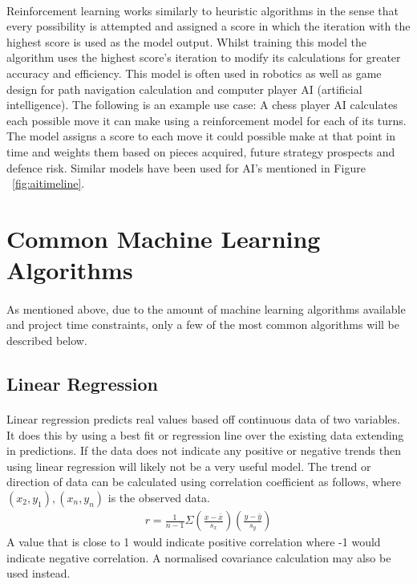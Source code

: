 \paragraph{}Reinforcement learning works similarly to heuristic algorithms in the sense that every possibility is attempted and assigned a score in which the iteration with the highest score is used as the model output. Whilst training this model the algorithm uses the highest score’s iteration to modify its calculations for greater accuracy and efficiency. This model is often used in robotics as well as game design for path navigation calculation and computer player AI (artificial intelligence). The following is an example use case: A chess player AI calculates each possible move it can make using a reinforcement model for each of its turns. The model assigns a score to each move it could possible make at that point in time and weights them based on pieces acquired, future strategy prospects and defence risk.
Similar models have been used for AI’s mentioned in Figure ~\ref{fig:aitimeline}.


\section{Common Machine Learning Algorithms}
\label{sec:section6}

\paragraph{}As mentioned above, due to the amount of machine learning algorithms available and project time constraints, only a few of the most common algorithms will be described below.
\subsection{Linear Regression} 
\paragraph{}Linear regression predicts real values based off continuous data of two variables. It does this by using a best fit or regression line over the existing data extending in predictions. If the data does not indicate any positive or negative trends then using linear regression will likely not be a very useful model. The trend or direction of data can be calculated using correlation coefficient as follows, where $\left( {{x_2},{y_1}} \right),\left( {{x_n},{y_n}} \right)$ is the observed data.
\begin{align*}
r = \frac{1}{{n - 1}}\Sigma \left( {\frac{{x - \bar x}}{{{s_x}}}} \right)\left( {\frac{{y - \bar y}}{{{s_y}}}} \right)
\end{align*}
A value that is close to 1 would indicate positive correlation where -1 would indicate negative correlation. A normalised covariance calculation may also be used instead.
